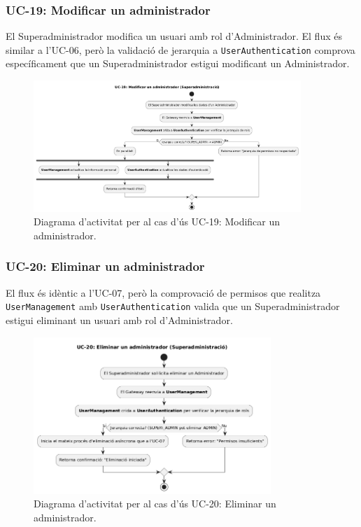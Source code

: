 \subsubsection{UC-19: Modificar un administrador}
El Superadministrador modifica un usuari amb rol d'Administrador. El flux és similar a l'UC-06, però la validació de jerarquia a \texttt{UserAuthentication} comprova específicament que un Superadministrador estigui modificant un Administrador.

\begin{figure}[H]
    \centering
    \includegraphics[width=0.9\textwidth]{Figures/ad_UC19.png}
    \caption{Diagrama d'activitat per al cas d'ús UC-19: Modificar un administrador.}
    \label{fig:ad_uc19_app}
\end{figure}

\subsubsection{UC-20: Eliminar un administrador}
El flux és idèntic a l'UC-07, però la comprovació de permisos que realitza \texttt{UserManagement} amb \texttt{UserAuthentication} valida que un Superadministrador estigui eliminant un usuari amb rol d'Administrador.

\begin{figure}[H]
    \centering
    \includegraphics[width=0.8\textwidth]{Figures/ad_UC20.png}
    \caption{Diagrama d'activitat per al cas d'ús UC-20: Eliminar un administrador.}
    \label{fig:ad_uc20_app}
\end{figure}

